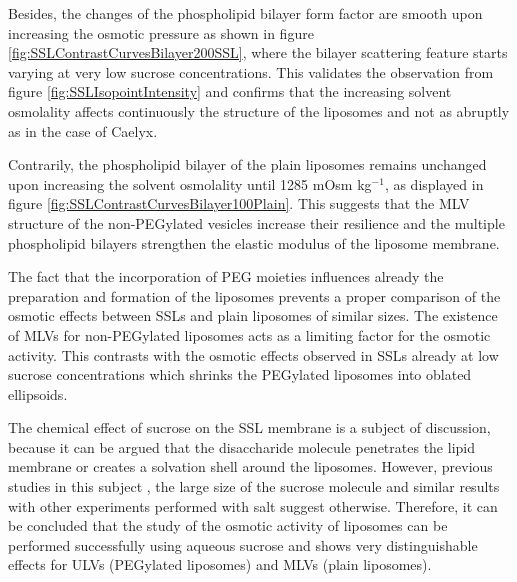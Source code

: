 %		

Besides, the changes of the phospholipid bilayer form factor are smooth upon increasing the osmotic pressure as shown in figure \ref{fig:SSLContrastCurvesBilayer200SSL}, where the bilayer scattering feature starts varying at very low sucrose concentrations. This validates the observation from figure \ref{fig:SSLIsopointIntensity} and confirms that the increasing solvent osmolality affects continuously the structure of the liposomes and not as abruptly as in the case of Caelyx.

Contrarily, the phospholipid bilayer of the plain liposomes remains unchanged upon increasing the solvent osmolality until 1285 mOsm kg$^{-1}$, as displayed in figure \ref{fig:SSLContrastCurvesBilayer100Plain}. This suggests that the MLV structure of the non-PEGylated vesicles increase their resilience and the multiple phospholipid bilayers strengthen the elastic modulus of the liposome membrane.

The fact that the incorporation of PEG moieties influences already the preparation and formation of the liposomes prevents a proper comparison of the osmotic effects between SSLs and plain liposomes of similar sizes. The existence of MLVs for non-PEGylated liposomes acts as a limiting factor for the osmotic activity. This contrasts with the osmotic effects observed in SSLs already at low sucrose concentrations which shrinks the PEGylated liposomes into oblated ellipsoids. 

The chemical effect of sucrose on the SSL membrane is a subject of discussion, because it can be argued that the disaccharide molecule penetrates the lipid membrane or creates a solvation shell around the liposomes. However, previous studies in this subject \citep{ kiselev_sucrose_2001-2, kiselev_sucrose_2001,kiselev_does_2003}, the large size of the sucrose molecule and similar results with other experiments performed with salt \citep{varga_osmotic_2014} suggest otherwise. Therefore, it can be concluded that the study of the osmotic activity of liposomes can be performed successfully using aqueous sucrose and shows very distinguishable effects for ULVs (PEGylated liposomes) and MLVs (plain liposomes).

